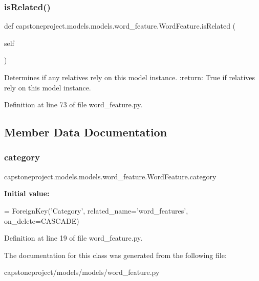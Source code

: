 \subsubsection{\texorpdfstring{is\+Related()}{isRelated()}}
{\footnotesize\ttfamily def capstoneproject.\+models.\+models.\+word\+\_\+feature.\+Word\+Feature.\+is\+Related (\begin{DoxyParamCaption}\item[{}]{self }\end{DoxyParamCaption})}

\begin{DoxyVerb}Determines if any relatives rely on this model instance.
:return: True if relatives rely on this model instance.
\end{DoxyVerb}
 

Definition at line 73 of file word\+\_\+feature.\+py.



\subsection{Member Data Documentation}
\mbox{\label{classcapstoneproject_1_1models_1_1models_1_1word__feature_1_1_word_feature_a2e6eed78d611bea9848cc7649eabab2a}} 
\subsubsection{\texorpdfstring{category}{category}}
{\footnotesize\ttfamily capstoneproject.\+models.\+models.\+word\+\_\+feature.\+Word\+Feature.\+category\hspace{0.3cm}{\ttfamily [static]}}

{\bfseries Initial value\+:}
\begin{DoxyCode}
=  ForeignKey(\textcolor{stringliteral}{'Category'}, related\_name=\textcolor{stringliteral}{'word\_features'},
                          on\_delete=CASCADE)
\end{DoxyCode}


Definition at line 19 of file word\+\_\+feature.\+py.



The documentation for this class was generated from the following file\+:\begin{DoxyCompactItemize}
\item 
capstoneproject/models/models/word\+\_\+feature.\+py\end{DoxyCompactItemize}
